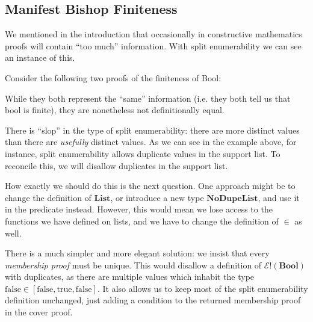 \subsection{Manifest Bishop Finiteness}
We mentioned in the introduction that occasionally in constructive mathematics
proofs will contain ``too much'' information.
With split enumerability we can see an instance of this.

\begin{agdalisting} \label{bool-slop}
  Consider the following two proofs of the finiteness of Bool:
  \begin{multicols}{2}
  \end{multicols}
  While they both represent the ``same'' information (i.e. they both tell us
  that bool is finite), they are nonetheless not definitionally equal.
\end{agdalisting}

There is ``slop'' in the type of split enumerability: there are more distinct
values than there are \emph{usefully} distinct values.
As we can see in the example above, for instance, split enumerability allows
duplicate values in the support list.
To reconcile this, we will disallow duplicates in the support list.

How exactly we should do this is the next question.
One approach might be to change the definition of \(\mathbf{List}\), or
introduce a new type \(\mathbf{NoDupeList}\), and use it in the predicate
instead.
However, this would mean we lose access to the functions we have defined on
lists, and we have to change the definition of \(\in\) as well.

There is a much simpler and more elegant solution: we insist that every
\emph{membership proof} must be unique.
This would disallow a definition of \(\mathcal{E}!(\mathbf{Bool})\) with
duplicates, as there are multiple values which inhabit the type \(\text{false}
\in \left[ \text{false}, \text{true}, \text{false} \right]\).
It also allows us to keep most of the split enumerability definition unchanged,
just adding a condition to the returned membership proof in the cover proof.

